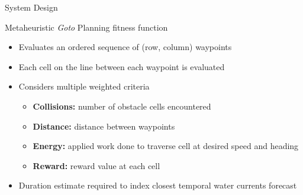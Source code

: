 \documentclass[9pt]{beamer}
\begin{document}
\begin{frame}{System Design} \label{SD:metaheuristic}
    \begin{block}{Metaheuristic \textit{Goto} Planning fitness function}
	    \begin{itemize}
	        \item Evaluates an ordered sequence of (row, column) waypoints
	        \item Each cell on the line between each waypoint is evaluated
	        \item Considers multiple weighted criteria
	        \begin{itemize}
	            \item \textbf{Collisions:} number of obstacle cells encountered
	            \item \textbf{Distance:} distance between waypoints
	            \item \textbf{Energy:} applied work done to traverse cell at desired speed and heading
	            \item \textbf{Reward:} reward value at each cell
	        \end{itemize}
	        \item Duration estimate required to index closest temporal water currents forecast
        \end{itemize}
    \end{block}


\end{frame}
\end{document}
